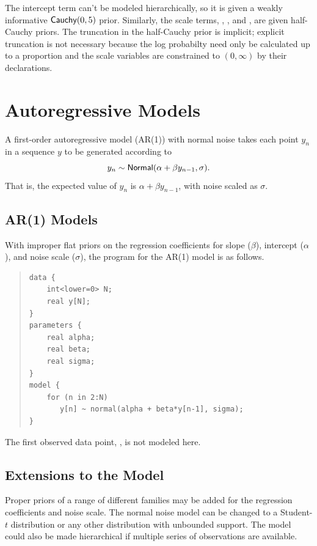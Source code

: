 The intercept term  can't be modeled hierarchically, so it
is given a weakly informative $\mbox{\sf Cauchy}(0,5)$ prior.
Similarly, the scale terms, , ,
and , are given half-Cauchy priors.  The truncation
in the half-Cauchy prior is implicit; explicit truncation is not
necessary because the log probabilty need only be calculated up to a
proportion and the scale variables are constrained to $(0,\infty)$ by 
their declarations.



\section{Autoregressive Models}

A first-order autoregressive model (AR(1)) with normal noise takes
each point $y_n$ in a sequence $y$ to be generated according to
%
\[
y_n \sim \mbox{\sf Normal}(\alpha + \beta y_{n-1}, \sigma).
\]
%
That is, the expected value of $y_n$ is $\alpha + \beta y_{n-1}$, with
noise scaled as $\sigma$.

\subsection{AR(1) Models}

With improper flat priors on the regression coefficients for slope
($\beta$), intercept ($\alpha$), and noise scale ($\sigma$),
the \Stan program for the AR(1) model is as follows.
%
\begin{quote}
\begin{Verbatim}
data {
    int<lower=0> N;
    real y[N];
}
parameters {
    real alpha;
    real beta;
    real sigma;
}
model {
    for (n in 2:N)
       y[n] ~ normal(alpha + beta*y[n-1], sigma);
}
\end{Verbatim}
\end{quote}
%
The first observed data point, , is not modeled here.  

\subsection{Extensions to the Model} 

Proper priors of a range of different families may be added for the
regression coefficients and noise scale.  The normal noise model can
be changed to a Student-$t$ distribution or any other distribution
with unbounded support.  The model could also be made hierarchical if
multiple series of observations are available.  

